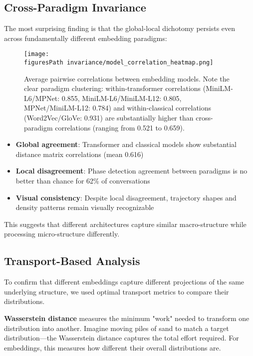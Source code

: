 \documentclass[11pt,letterpaper]{article}
\newcommand{\crossParadigmCorr}{0.616}
\newcommand{\figuresPath}{../analysis/analysis_output/figures/}
\begin{document}
\subsection{Cross-Paradigm Invariance}

The most surprising finding is that the global-local dichotomy persists even across fundamentally different embedding paradigms:

\begin{figure}[H]
\centering
\texttt{[image: \\figuresPath invariance/model\_correlation\_heatmap.png]}
\caption{Average pairwise correlations between embedding models. Note the clear paradigm clustering: within-transformer correlations (MiniLM-L6/MPNet: 0.855, MiniLM-L6/MiniLM-L12: 0.805, MPNet/MiniLM-L12: 0.784) and within-classical correlations (Word2Vec/GloVe: 0.931) are substantially higher than cross-paradigm correlations (ranging from 0.521 to 0.659).}
\label{fig:pairwise}
\end{figure}

\begin{itemize}
\item \textbf{Global agreement}: Transformer and classical models show substantial distance matrix correlations (mean \crossParadigmCorr{})
\item \textbf{Local disagreement}: Phase detection agreement between paradigms is no better than chance for 62\% of conversations
\item \textbf{Visual consistency}: Despite local disagreement, trajectory shapes and density patterns remain visually recognizable
\end{itemize}

This suggests that different architectures capture similar macro-structure while processing micro-structure differently.

\subsection{Transport-Based Analysis}

To confirm that different embeddings capture different projections of the same underlying structure, we used optimal transport metrics to compare their distributions.

\textbf{Wasserstein distance} measures the minimum "work" needed to transform one distribution into another. Imagine moving piles of sand to match a target distribution—the Wasserstein distance captures the total effort required. For embeddings, this measures how different their overall distributions are.
\end{document}

